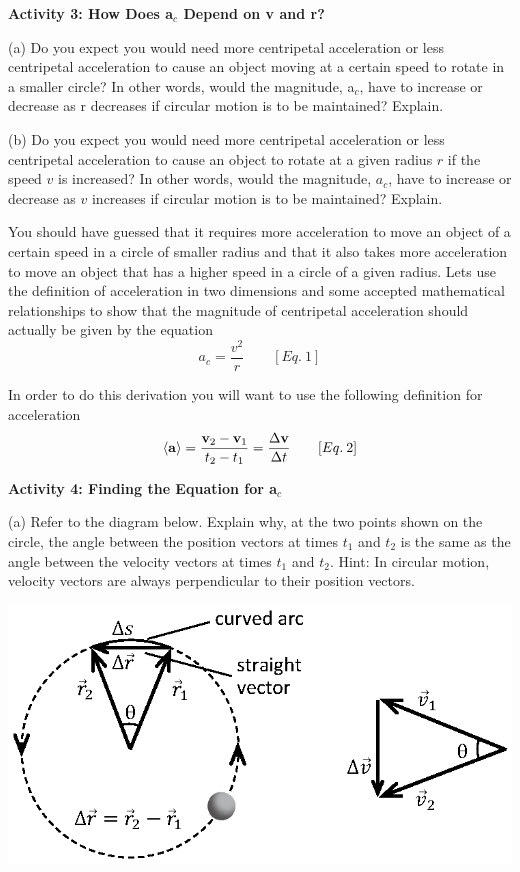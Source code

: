 \textbf{Activity 3: How Does a\( _{c} \) Depend on v and r?} 

(a) Do you expect you would need more centripetal acceleration or less centripetal
acceleration to cause an object moving at a certain speed to rotate in a smaller
circle? In other words, would the magnitude, a\( _{c} \), have to increase
or decrease as r decreases if circular motion is to be maintained? Explain.
\vspace{20mm}

(b) Do you expect you would need more centripetal acceleration or less centripetal
acceleration to cause an object to rotate at a given radius $r$ if the speed $v$
is increased? In other words, would the magnitude, \( a_{c} \), have to increase
or decrease as $v$ increases if circular motion is to be maintained? Explain.
\vspace{20mm}

You should have guessed that it requires more acceleration to move an object
of a certain speed in a circle of smaller radius and that it also takes more
acceleration to move an object that has a higher speed in a circle of a given
radius. Lets use the definition of acceleration in two dimensions and some accepted
mathematical relationships to show that the magnitude of centripetal acceleration
should actually be given by the equation
\[
a_{c}=\frac{v^{2}}{r}\qquad [Eq.\: 1]\]


In order to do this derivation you will want to use the following definition
for acceleration
\[
\left\langle {\bf a}\right\rangle =\frac{{{\bf v}_{2}}-{{\bf v}_{1}}}{t_{2}-t_{1}}=\frac{\Delta {\bf v}}{\Delta t}\qquad [Eq.\: 2]\]


\textbf{Activity 4: Finding the Equation for a\( _{c} \) }

(a) Refer to the diagram below. Explain why, at the two points shown on the
circle, the angle between the position vectors at times \( t_{1} \) and \( t_{2} \)
is the same as the angle between the velocity vectors at times \( t_{1} \)
and \( t_{2} \). Hint: In circular motion, velocity vectors are always perpendicular
to their position vectors.

\vspace{0.3cm}
{\par\raggedright \includegraphics{circ_motion/circ_motion_fig3_new.eps} \par}
\vspace{0.3cm}

